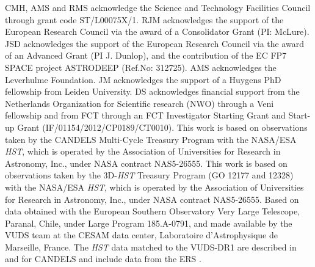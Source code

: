 \documentclass[fleqn,usenatbib]{mn2e}
\begin{document}
CMH, AMS and RMS acknowledge the Science and Technology Facilities Council through grant code ST/L00075X/1.
RJM acknowledges the support of the European Research Council via the award of a Consolidator Grant (PI: McLure).
JSD acknowledges the support of the European Research Council via the award of an Advanced Grant (PI J. Dunlop), and the contribution of the EC FP7 SPACE project ASTRODEEP (Ref.No: 312725).
AMS acknowledges the Leverhulme Foundation.
JM acknowledges the support of a Huygens PhD fellowship from Leiden University. DS acknowledges financial support from the Netherlands Organization for Scientific research (NWO) through a Veni fellowship and from FCT through an FCT Investigator Starting Grant and Start-up Grant (IF/01154/2012/CP0189/CT0010).
This work is based on observations taken by the CANDELS Multi-Cycle Treasury Program with the NASA/ESA {\em HST}, which is operated by the Association of Universities for Research in Astronomy, Inc., under NASA contract NAS5-26555.
This work is based on observations taken by the 3D-{\em HST} Treasury Program (GO 12177 and 12328) with the NASA/ESA {\em HST}, which is operated by the Association of Universities for Research in Astronomy, Inc., under NASA contract NAS5-26555.
Based on data obtained with the European Southern Observatory Very Large Telescope, Paranal, Chile, under Large Program 185.A-0791, and made available by the VUDS team at the CESAM data center, Laboratoire d'Astrophysique de Marseille, France.
The {\em HST} data matched to the VUDS-DR1 are described in \cite{Grogin2011} and \cite{Koekemoer2011} for CANDELS and include data from the ERS \cite{Windhorst2011}.




%


\clearpage 

%

\clearpage


\end{document}
